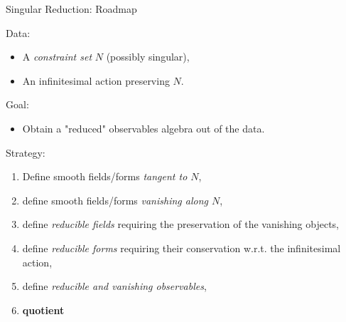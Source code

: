 \documentclass[beamer,10pt]{standalone}
\begin{document}
\begin{frame}{Singular Reduction: Roadmap}
	\begin{block}{Data:}
			\begin{itemize}
				\item A \emph{constraint set} $N$ (possibly singular),
				\item An infinitesimal action preserving $N$.
			\end{itemize}
	\end{block}
	\vfill
	\pause
	\begin{block}{Goal:}
		\begin{itemize}
			\item Obtain a "reduced" observables algebra out of the data.
		\end{itemize}
	\end{block}
	\vfill
	\pause
	\begin{block}{Strategy:}
		\begin{enumerate}
			\item Define smooth fields/forms \emph{tangent to $N$},
			\item define smooth fields/forms \emph{vanishing along $N$},
			\item define \emph{reducible fields} requiring the preservation of the vanishing objects,
			\item define \emph{reducible forms} requiring their conservation w.r.t. the infinitesimal action,
			\item define \emph{reducible and vanishing observables},
			\item \textbf{quotient}
		\end{enumerate}
	\end{block}






\end{frame}
\note[itemize]{
	\item
}

\end{document}
